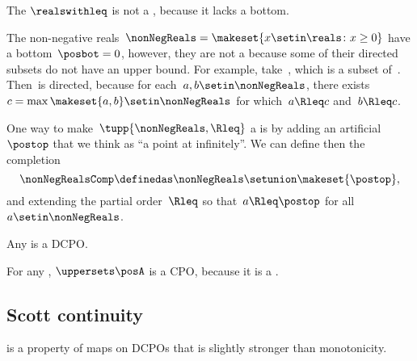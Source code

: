 \begin{example}
    \label{exa:Rcomp}
    The  $\realswithleq$ is not a \CPO, because it lacks a bottom.

    The non-negative reals~$\nonNegReals=\makeset{x\setin\reals \colon x\geq0}$ have a bottom~$\posbot=0$, however, they are not a \DCPO because some of their directed subsets do not have an upper bound.
    For example, take~\nonNegReals, which is a subset of~\nonNegReals .
    Then~\nonNegReals  is directed, because for each~$a,b\setin\nonNegReals$, there exists~$c=\max\makeset{a,b}\setin\nonNegReals$ for which~$a\Rleq c$ and~$b\Rleq c$.

    One way to make~$\tupp{ \nonNegReals,{{\Rleq}}} $ a \CPO is by adding an artificial ~$\postop$ that we think as ``a point at infinitely''.
    We can define then the completion
    \begin{equation}
        \nonNegRealsComp\definedas\nonNegReals\setunion\makeset{\postop},
    \end{equation} and extending the partial order~$\Rleq$ so that~$a\Rleq\postop$ for all~$a\setin\nonNegReals$.
\end{example}

\begin{example}
    Any  is a DCPO.
\end{example}
\begin{example}
    For any  \posA, $\uppersets \posA$ is a CPO, because it is a .
\end{example}

\subsection{Scott continuity}

 is a property of maps on DCPOs that is slightly stronger than monotonicity.

